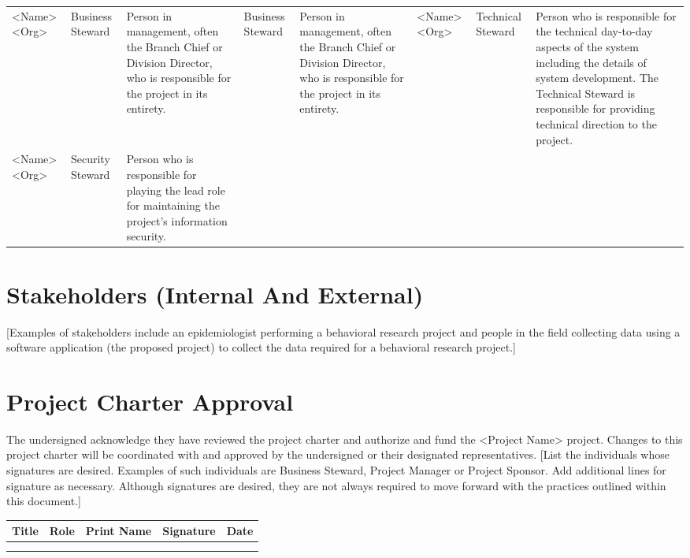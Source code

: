 \documentclass[11pt]{article}
\begin{document}
\begin{center}
\begin{tabular}{llllllll}
<Name><Org> & Business Steward & Person in management, often the Branch Chief or Division Director, who is responsible for the project in its entirety. & Business Steward & Person in management, often the Branch Chief or Division Director, who is responsible for the project in its entirety. & <Name><Org> & Technical Steward & Person who is responsible for the technical day-to-day aspects of the system including the details of system development.  The Technical Steward is responsible for providing technical direction to the project.\\
<Name><Org> & Security Steward & Person who is responsible for playing the lead role for maintaining the project’s information security. &  &  &  &  & \\
\end{tabular}
\end{center}
\section{Stakeholders (Internal And External)}
\label{sec:orgaf028e7}
[Examples of stakeholders include an epidemiologist performing a behavioral research project and people in the field collecting data using a software application (the proposed project) to collect the data required for a behavioral research project.]

\section{Project Charter Approval}
\label{sec:org4ad9be0}
The undersigned acknowledge they have reviewed the project charter and authorize and fund the <Project Name> project.  Changes to this project charter will be coordinated with and approved by the undersigned or their designated representatives.
[List the individuals whose signatures are desired.  Examples of such individuals are Business Steward, Project Manager or Project Sponsor.  Add additional lines for signature as necessary. Although signatures are desired, they are not always required to move forward with the practices outlined within this document.]

\begin{center}
\begin{tabular}{lllll}
Title & Role & Print Name & Signature & Date\\
\hline
 &  &  &  & \\
\hline
 &  &  &  & \\
\end{tabular}
\end{center}
\end{document}
